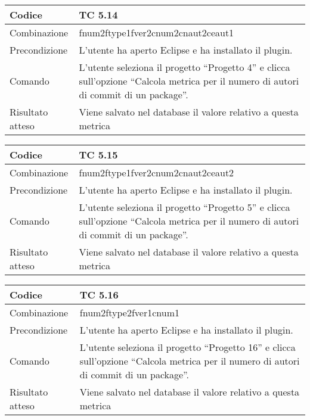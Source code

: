 \begin{table}[ht]
\begin{tabular}{|p{3cm}|p{9cm}|}
\hline
\cellcolor{lightgray}Codice				& TC 5.14								\\
\hline
\cellcolor{lightgray}Combinazione		& fnum2ftype1fver2cnum2cnaut2ceaut1								\\
\hline
\cellcolor{lightgray}Precondizione		& L'utente ha aperto Eclipse e ha installato il plugin.			\\
\hline
\cellcolor{lightgray}Comando			& L'utente seleziona il progetto ``Progetto 4''  e clicca sull'opzione ``Calcola metrica per il numero di autori di commit di un package''.	\\
\hline
\cellcolor{lightgray}Risultato atteso	& Viene salvato nel database il valore relativo a questa metrica	\\
\hline
\end{tabular}
\end{table}

\begin{table}[ht]
\begin{tabular}{|p{3cm}|p{9cm}|}
\hline
\cellcolor{lightgray}Codice				& TC 5.15								\\
\hline
\cellcolor{lightgray}Combinazione		& fnum2ftype1fver2cnum2cnaut2ceaut2 									\\
\hline
\cellcolor{lightgray}Precondizione		& L'utente ha aperto Eclipse e ha installato il plugin.			\\
\hline
\cellcolor{lightgray}Comando			& L'utente seleziona il progetto ``Progetto 5''  e clicca sull'opzione ``Calcola metrica per il numero di autori di commit di un package''.	\\
\hline
\cellcolor{lightgray}Risultato atteso	& Viene salvato nel database il valore relativo a questa metrica	\\
\hline
\end{tabular}
\end{table}



\begin{table}[ht]
\begin{tabular}{|p{3cm}|p{9cm}|}
\hline
\cellcolor{lightgray}Codice				& TC 5.16								\\
\hline
\cellcolor{lightgray}Combinazione		& fnum2ftype2fver1cnum1								\\
\hline
\cellcolor{lightgray}Precondizione		& L'utente ha aperto Eclipse e ha installato il plugin.				\\
\hline
\cellcolor{lightgray}Comando			& L'utente seleziona il progetto ``Progetto 16''  e clicca sull'opzione ``Calcola metrica per il numero di autori di commit di un package''.	\\
\hline
\cellcolor{lightgray}Risultato atteso	& Viene salvato nel database il valore relativo a questa metrica	\\
\hline
\end{tabular}
\end{table}

